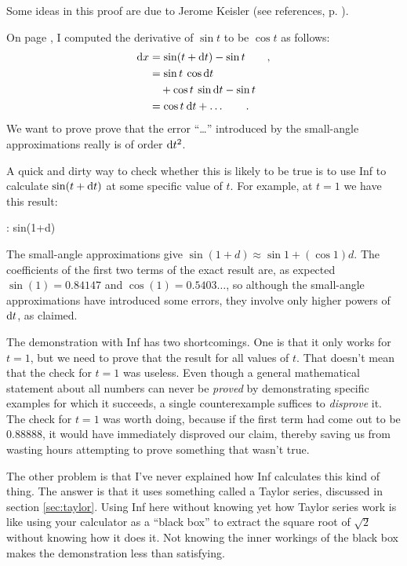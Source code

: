 Some ideas in this proof are due to Jerome Keisler (see references, p. \pageref{references}).

On page \pageref{eg:derivative-of-sin}, I computed the derivative of $\sin t$ to be $\cos t$
as follows:
\begin{align*}
  \textup{d} x &= \sin(t+\textup{d} t)-\sin t \qquad , \\
         &= \sin t \: \cos \textup{d} t \\
         &\quad + \cos t \: \sin \textup{d} t - \sin t \\
         &= \cos t \: \textup{d} t + \ldots\qquad .
\end{align*}
We want to prove prove that the error ``\ldots'' introduced by the small-angle approximations really
is of order $\textup{d} t^2$. 

A quick and dirty way to check whether this is likely to be true is to
use Inf to calculate $\sin(t+\textup{d} t)$ at some specific value of $t$. For example, at $t=1$ we have
this result:
\begin{Code}
  \ii : sin(1+d)
\end{Code}
The small-angle approximations give $\sin(1+d)\approx\sin 1+(\cos 1)d$.
The coefficients of the first two terms of the exact result are, as expected $\sin(1)=0.84147$ and $\cos(1)=0.5403\ldots$, so although the
small-angle approximations have introduced some errors, they involve only higher powers of $\textup{d} t$, as claimed.

The demonstration with Inf has two shortcomings. One is that it only works for $t=1$, but we need to
prove that the result for all values of $t$. That doesn't mean that the check for $t=1$ was useless.
Even though a general mathematical statement about all numbers can never be \emph{proved} by demonstrating
specific examples for which it succeeds, a single counterexample suffices to \emph{disprove} it.
The check for $t=1$ was worth doing, because if the first term had come out to be
0.88888, it would have immediately disproved our claim, thereby
saving us from wasting hours attempting to prove something that wasn't true.

The other problem is that I've never explained how Inf calculates this kind of thing.
The answer is that it uses something called
a Taylor series, discussed in section \ref{sec:taylor}. Using Inf here without knowing yet how Taylor series
work is like using your calculator as a ``black box'' to extract the square root of $\sqrt{2}$ without knowing how
it does it. Not knowing the inner workings of the black box makes the demonstration less than satisfying.

